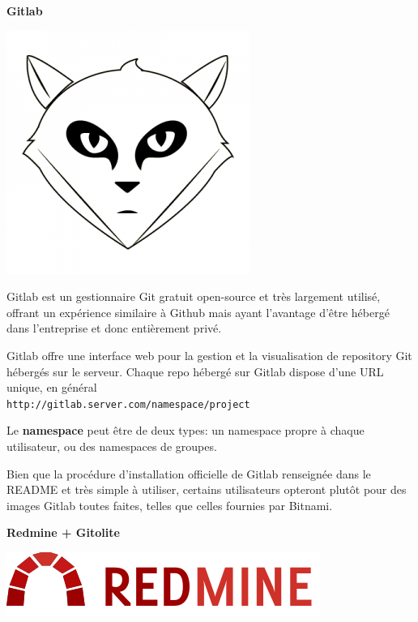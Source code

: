 \documentclass{../../common/tufte-latex/tufte-handout}
\begin{document}
\textbf{Gitlab}

\begin{marginfigure}%
  \centering
  \includegraphics[width=0.6\linewidth]{gitlab-logo.png}
  \label{fig:gitlablogo}
\end{marginfigure}

\noindent Gitlab est un gestionnaire Git gratuit open-source et très largement utilisé, offrant un expérience similaire à Github mais ayant l'avantage d'être  hébergé dans l'entreprise et donc entièrement privé.

Gitlab offre une interface web pour la gestion et la visualisation de repository Git hébergés sur le serveur.
Chaque repo hébergé sur Gitlab dispose d'une URL unique, en général \\ \noindent \texttt{http://gitlab.server.com/namespace/project}

Le \textbf{namespace} peut être de deux types: un namespace propre à chaque utilisateur, ou des namespaces de groupes.

Bien que la procédure d'installation officielle de Gitlab renseignée dans le README et très simple à utiliser, certains utilisateurs opteront plutôt pour des images Gitlab toutes faites, telles que celles fournies par Bitnami. 

\textbf{Redmine + Gitolite}

\begin{marginfigure}%
  \centering
  \includegraphics[width=0.6\linewidth]{redmine-logo.png}
  \label{fig:gitlablogo}
\end{marginfigure}
\end{document}
